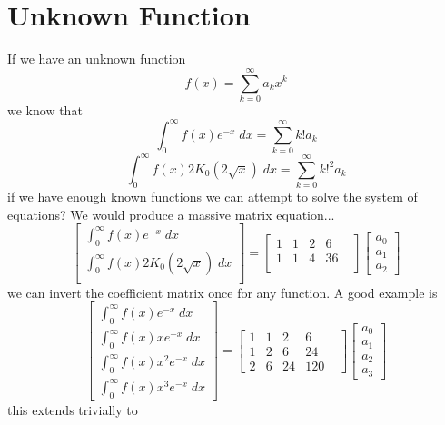 \documentclass{article}
\begin{document}
\section{Unknown Function}
If we have an unknown function
$$
f(x) = \sum_{k=0}^\infty a_k x^k
$$
we know that 
$$
\int_0^\infty f(x) e^{-x} \; dx = \sum_{k=0}^\infty k! a_k
$$
$$
\int_0^\infty f(x) 2K_0(2 \sqrt{x}) \; dx = \sum_{k=0}^\infty k!^2 a_k
$$
if we have enough known functions we can attempt to solve the system of equations? We would produce a massive matrix equation... 
\begin{equation}
\begin{bmatrix}
\int_0^\infty f(x) e^{-x} \; dx \\
\int_0^\infty f(x) 2K_0(2 \sqrt{x}) \; dx \\

\end{bmatrix}
=
\begin{bmatrix}
1 & 1 & 2 & 6 & \\
1 & 1 & 4 & 36 & \\
\end{bmatrix}
\begin{bmatrix}
a_0 \\ a_1 \\ a_2
\end{bmatrix}
\end{equation}
we can invert the coefficient matrix once for any function. A good example is 
\begin{equation}
\begin{bmatrix}
\int_0^\infty f(x) e^{-x} \; dx \\
\int_0^\infty f(x) x e^{-x} \; dx \\
\int_0^\infty f(x) x^2 e^{-x} \; dx \\
\int_0^\infty f(x) x^3 e^{-x} \; dx
\end{bmatrix}
=
\begin{bmatrix}
1 & 1 & 2 & 6 & \\
1 & 2 & 6 & 24 & \\
2 & 6 & 24 & 120
\end{bmatrix}
\begin{bmatrix}
a_0 \\ a_1 \\ a_2 \\ a_3
\end{bmatrix}
\end{equation}
this extends trivially to 
\end{document}
